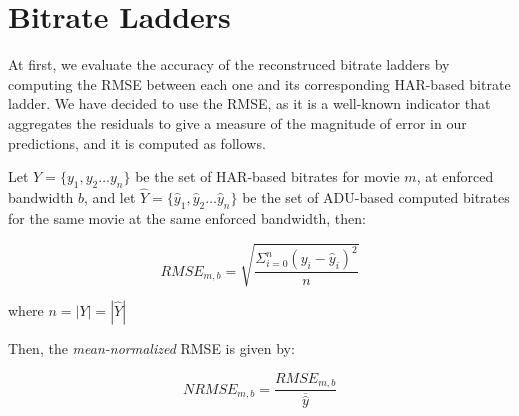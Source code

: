 
\section{Bitrate Ladders}

At first, we evaluate the accuracy of the reconstruced bitrate ladders by computing the RMSE between each one and its corresponding HAR-based bitrate ladder. We have decided to use the RMSE, as it is a well-known indicator that aggregates the residuals to give a measure of the magnitude of error in our predictions, and it is computed as follows.

Let $Y=\{y_1, y_2 \dots y_n\}$ be the set of HAR-based bitrates for movie $m$, at enforced bandwidth
$b$, and let $\hat{Y}=\{\hat{y}_1, \hat{y}_2 \dots \hat{y}_n\}$ be the set of ADU-based computed bitrates for the same
movie at the same enforced bandwidth, then:

\begin{equation*}
    RMSE_{m, b} = \sqrt{\dfrac{\Sigma_{i=0}^{n}(y_i - \hat{y}_i)^2}{n}}
\end{equation*}

where $n = |Y| = |\hat{Y}|$

Then, the \emph{mean-normalized} RMSE is given by:

\begin{equation*}
    NRMSE_{m, b} = \dfrac{RMSE_{m, b}}{\overline{\hat{y}}}
\end{equation*}


